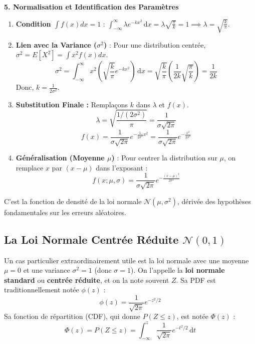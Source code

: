 \begin{proofbox}
\textbf{5. Normalisation et Identification des Paramètres}
\begin{enumerate}
    \item \textbf{Condition $\int f(x) dx = 1$} :
    $\int_{-\infty}^{\infty} \lambda e^{-k x^2} \, \mathrm{d}x = \lambda \sqrt{\frac{\pi}{k}} = 1 \implies \lambda = \sqrt{\frac{k}{\pi}}$.
    \item \textbf{Lien avec la Variance ($\sigma^2$)} : Pour une distribution centrée, $\sigma^2 = E[X^2] = \int x^2 f(x) dx$.
    $$ \sigma^2 = \int_{-\infty}^{\infty} x^2 \left( \sqrt{\frac{k}{\pi}} e^{-k x^2} \right) \, \mathrm{d}x = \sqrt{\frac{k}{\pi}} \left( \frac{1}{2k} \sqrt{\frac{\pi}{k}} \right) = \frac{1}{2k} $$
    Donc, $k = \frac{1}{2\sigma^2}$.
    \item \textbf{Substitution Finale :} Remplaçons $k$ dans $\lambda$ et $f(x)$.
    $$ \lambda = \sqrt{\frac{1/(2\sigma^2)}{\pi}} = \frac{1}{\sigma\sqrt{2\pi}} $$
    $$ f(x) = \frac{1}{\sigma\sqrt{2\pi}} e^{-\frac{1}{2\sigma^2} x^2} = \frac{1}{\sigma\sqrt{2\pi}} e^{ -\frac{x^2}{2\sigma^2} } $$
    \item \textbf{Généralisation (Moyenne $\mu$)} : Pour centrer la distribution sur $\mu$, on remplace $x$ par $(x-\mu)$ dans l'exposant :
    $$ f(x; \mu, \sigma) = \frac{1}{\sigma \sqrt{2\pi}} e^{ -\frac{(x-\mu)^2}{2\sigma^2} } $$
\end{enumerate}
C'est la fonction de densité de la loi normale $\mathcal{N}(\mu, \sigma^2)$, dérivée des hypothèses fondamentales sur les erreurs aléatoires.
\end{proofbox}

\subsection{La Loi Normale Centrée Réduite $\mathcal{N}(0, 1)$}

\begin{definitionbox}
Un cas particulier extraordinairement utile est la loi normale avec une moyenne $\mu=0$ et une variance $\sigma^2=1$ (donc $\sigma=1$). On l'appelle la \textbf{loi normale standard} ou \textbf{centrée réduite}, et on la note souvent $Z$. Sa PDF est traditionnellement notée $\phi(z)$ :
$$ \phi(z) = \frac{1}{\sqrt{2\pi}} e^{-z^2/2} $$
Sa fonction de répartition (CDF), qui donne $P(Z \le z)$, est notée $\Phi(z)$ :
$$ \Phi(z) = P(Z \le z) = \int_{-\infty}^z \frac{1}{\sqrt{2\pi}} e^{-t^2/2} \, \mathrm{d}t $$
\end{definitionbox}

